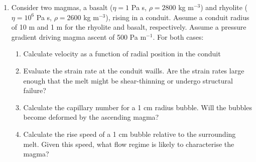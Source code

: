 \documentclass[]{book}
\theoremstyle{definition}
\begin{document}
\begin{enumerate}
\item Consider two magmas, a basalt ($\eta = 1$ Pa s, $\rho = 2800$ kg m$^{-3}$) and rhyolite ($\eta = 10^{6}$ Pa s, $\rho = 2600$ kg m$^{-3}$), rising in a conduit. Assume a conduit radius of 10 m and 1 m for the rhyolite and basalt, respectively. Assume a pressure gradient driving magma ascent of 500 Pa m$^{-1}$. For both cases:

  \begin{enumerate}
  \item Calculate velocity as a function of radial position in the conduit \\
  \item Evaluate the strain rate at the conduit waills. Are the strain rates large enough that the melt might be shear-thinning or undergo structural failure?
  \item Calculate the capillary number for a 1 cm radius bubble. Will the bubbles become deformed by the ascending magma?
  \item Calculate the rise speed of a 1 cm bubble relative to the surrounding melt. Given this speed, what flow regime is likely to characterise the magma?
  \end{enumerate}
\end{enumerate}

  
\end{document}
